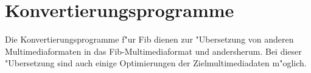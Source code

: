 \documentclass[10pt,a4paper]{article}
\begin{document}
\section{Konvertierungsprogramme}

Die Konvertierungsprogramme f"ur Fib dienen zur "Ubersetzung von anderen Multimediaformaten in das Fib-Multimediaformat und andersherum. Bei dieser "Ubersetzung sind auch einige Optimierungen der Zielmultimediadaten m"oglich.
\end{document}
